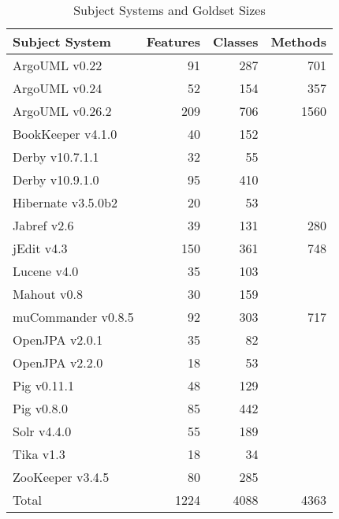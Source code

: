 \begin{table}[t]
\renewcommand{\arraystretch}{1.3}
\footnotesize
\centering
\caption{Subject Systems and Goldset Sizes}
\begin{tabular}{lrrr}
    \toprule
    Subject System      & Features  & Classes   & Methods \\
    \midrule
    ArgoUML v0.22 & 91 & 287 & 701 \\
    ArgoUML v0.24 & 52 & 154 & 357 \\
    ArgoUML v0.26.2 & 209 & 706 & 1560 \\
    BookKeeper v4.1.0 & 40 & 152 &   \\
    Derby v10.7.1.1 & 32 & 55 &   \\
    Derby v10.9.1.0 & 95 & 410 &   \\
    Hibernate v3.5.0b2 & 20 & 53 &   \\
    Jabref v2.6 & 39 & 131 & 280 \\
    jEdit v4.3 & 150 & 361 & 748 \\
    Lucene v4.0 & 35 & 103 &   \\
    Mahout v0.8 & 30 & 159 &   \\
    muCommander v0.8.5 & 92 & 303 & 717 \\
    OpenJPA v2.0.1 & 35 & 82 &   \\
    OpenJPA v2.2.0 & 18 & 53 &   \\
    Pig v0.11.1 & 48 & 129 &   \\
    Pig v0.8.0 & 85 & 442 &   \\
    Solr v4.4.0 & 55 & 189 &   \\
    Tika v1.3 & 18 & 34 &   \\
    ZooKeeper v3.4.5 & 80 & 285 &   \\
    \midrule
    Total & 1224 & 4088 & 4363 \\
    \bottomrule
\end{tabular}
\label{table:subjects}
\end{table}

